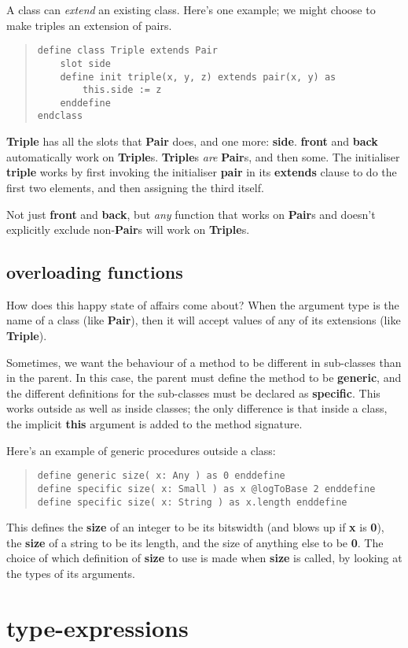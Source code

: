 \documentclass{report}
\begin{document}
A class can {\em extend} an existing class. Here's one example; we might
choose to make triples an extension of pairs.

\begin{quote}
\begin{verbatim}
define class Triple extends Pair
    slot side
    define init triple(x, y, z) extends pair(x, y) as
        this.side := z
    enddefine
endclass
\end{verbatim}
\end{quote}
{\bf Triple} has all the slots that {\bf Pair} does, and one more: {\bf side}. {\bf front} and
{\bf back} automatically work on {\bf Triple}s. {\bf Triple}s {\em are} {\bf Pair}s, and then
some. The initialiser {\bf triple} works by first invoking the initialiser {\bf pair}
in its {\bf extends} clause to do the first two elements, and then assigning the
third itself.

Not just {\bf front} and {\bf back}, but {\em any} function that works on {\bf Pair}s and
doesn't explicitly exclude non-{\bf Pair}s will work on {\bf Triple}s.\section{overloading functions}


How does this happy state of affairs come about? When the argument type is the
name of a class (like {\bf Pair}), then it will accept values of any of its
extensions (like {\bf Triple}).

Sometimes, we want the behaviour of a method to be different in sub-classes
than in the parent. In this case, the parent must define the method to be
{\bf generic}, and the different definitions for the sub-classes must be declared
as {\bf specific}. This works outside as well as inside classes; the only
difference is that inside a class, the implicit {\bf this} argument is added to
the method signature.

Here's an example of generic procedures outside a class:

\begin{quote}
\begin{verbatim}
define generic size( x: Any ) as 0 enddefine
define specific size( x: Small ) as x @logToBase 2 enddefine
define specific size( x: String ) as x.length enddefine
\end{verbatim}
\end{quote}
This defines the {\bf size} of an integer to be its bitswidth (and blows up if {\bf x}
is {\bf 0}), the {\bf size} of a string to be its length, and the size of anything
else to be {\bf 0}. The choice of which definition of {\bf size} to use is made when
{\bf size} is called, by looking at the types of its arguments.\chapter{type-expressions}
\end{document}
